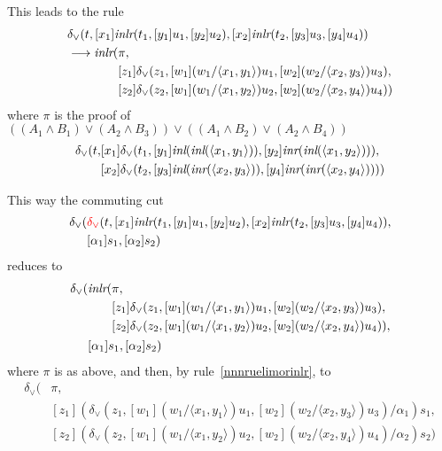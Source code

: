 \documentclass[screen, sigconf,authorversion,nonacm]{acmart}
\theoremstyle{acmdefinition}
\numberwithin{equation}{section}
\newcommand\abstr[1]{[#1]}
\newcommand\inl{\mbox{\it inl}}
\newcommand\inr{\mbox{\it inr}}
\newcommand\inlr{\mbox{\it inlr}}
\newcommand\elimor{\delta_{\vee}}
\newcommand\elimorint{{\color{red} \delta_{\vee}}}
\newcommand\pair[2]{\langle #1, #2 \rangle}
\newcommand\lra{\longrightarrow}
\begin{document}
This leads to the rule
\begin{align*}
  &\elimor(t,\abstr{x_1} \inlr(t_1, \abstr{y_1}u_1,\abstr{y_2} u_2), \abstr{x_2} \inlr(t_2, \abstr{y_3}u_3,\abstr{y_4} u_4)) \\
  &\lra
  \inlr
  \begin{aligned}[t]
    (
      &\pi,\\
      &
      \abstr{z_1}\elimor(z_1,
	\abstr{w_1} (w_1/\pair{x_1}{y_1})u_1, 
      \abstr{w_2} (w_2/\pair{x_2}{y_3})u_3),\\
      &
      \abstr{z_2}\elimor(z_2,
	\abstr{w_1} (w_1/\pair{x_1}{y_2})u_2, 
      \abstr{w_2} (w_2/\pair{x_2}{y_4})u_4)
    )
  \end{aligned}
\end{align*}
where $\pi$ is the proof of $((A_1 \wedge B_1) \vee (A_2 \wedge B_3))
\vee ((A_1 \wedge B_2) \vee (A_2 \wedge B_4))$
\begin{align*}
  \elimor(t,
&[x_1]\elimor(t_1,[y_1]\inl(\inl(\pair{x_1}{y_1})), [y_2]\inr(\inl(\pair{x_1}{y_2}))),\\
&[x_2]\elimor(t_2,[y_3]\inl(\inr(\pair{x_2}{y_3})), [y_4]\inr(\inr(\pair{x_2}{y_4}))))
\end{align*}

This way the commuting cut 
$$\elimor(
  \begin{aligned}[t]
  &\elimorint(t,\abstr{x_1} \inlr(t_1, \abstr{y_1}u_1,\abstr{y_2} u_2), \abstr{x_2} \inlr(t_2, \abstr{y_3}u_3,\abstr{y_4} u_4)),\\
  &\abstr{\alpha_1}s_1, \abstr{\alpha_2}s_2)
\end{aligned}$$
reduces to
$$\elimor(
  \begin{aligned}[t]
    &\inlr
    \begin{aligned}[t]
      (
	&\pi,\\
	&
	\abstr{z_1}\elimor(z_1,
	  \abstr{w_1} (w_1/\pair{x_1}{y_1})u_1, 
	\abstr{w_2} (w_2/\pair{x_2}{y_3})u_3),\\
	&
	\abstr{z_2}\elimor(z_2,
	  \abstr{w_1} (w_1/\pair{x_1}{y_2})u_2, 
	\abstr{w_2} (w_2/\pair{x_2}{y_4})u_4)
      ),
    \end{aligned}\\
  &  \abstr{\alpha_1}s_1,\abstr{\alpha_2}s_2)
  \end{aligned}$$
where $\pi$ is as above, and then, by rule~\eqref{nnnruelimorinlr}, to
\begin{align*}
\elimor(&\pi,\\
&\abstr{z_1}
(\elimor(z_1,
	  \abstr{w_1} (w_1/\pair{x_1}{y_1})u_1, 
	\abstr{w_2} (w_2/\pair{x_2}{y_3})u_3)/\alpha_1)s_1,\\
&\abstr{z_2}(\elimor(z_2,
	  \abstr{w_1} (w_1/\pair{x_1}{y_2})u_2, 
	\abstr{w_2} (w_2/\pair{x_2}{y_4})u_4)/\alpha_2)s_2)
\end{align*}
\end{document}
